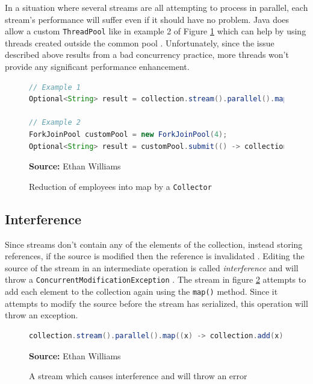 \documentclass[oneside, 12pt]{article}
\newcommand{\source}[1]{\textbf{Source:} {#1} }
\begin{document}
In a situation where several streams are all attempting to process in parallel, each stream's performance will suffer even if it should have no problem. Java does allow a custom \verb|ThreadPool| like in example 2 of Figure \ref{fig:network_op} which can help by using threads created outside the common pool \autocite{dzone_fjp}. Unfortunately, since the issue described above results from a bad concurrency practice, more threads won't provide any significant performance enhancement.

\begin{figure}[H]
\centering
\begin{lstlisting}[language=Java]
// Example 1
Optional<String> result = collection.stream().parallel().map((base) -> longOperation(argument)).findAny();

// Example 2
ForkJoinPool customPool = new ForkJoinPool(4);
Optional<String> result = customPool.submit(() -> collection.stream().parallel().map((arg) -> longOperation(arg)).findAny()).get();
\end{lstlisting}
\caption{Reduction of employees into map by a {\tt Collector}}
\source{Ethan Williams}
\label{fig:network_op}
\end{figure}

\subsection{Interference}
Since streams don't contain any of the elements of the collection, instead storing references, if the source is modified then the reference is invalidated \autocite{ibm_streams}. Editing the source of the stream in an intermediate operation is called \textit{interference} and will throw a \verb|ConcurrentModificationException| \autocite{parallelism_doc}. The stream in figure \ref{fig:interference} attempts to add each element to the collection again using the \verb|map()| method. Since it attempts to modify the source before the stream has serialized, this operation will throw an exception.

\begin{figure}[H]
\centering
\begin{lstlisting}[language=Java]
collection.stream().parallel().map((x) -> collection.add(x)).toArray();
\end{lstlisting}
\caption{A stream which causes interference and will throw an error}
\source{Ethan Williams}
\label{fig:interference}
\end{figure}
\end{document}
